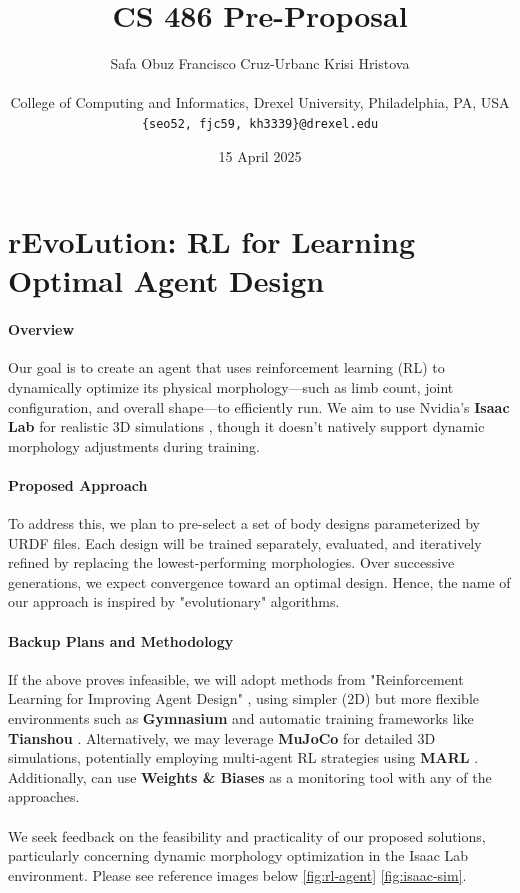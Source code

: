 \documentclass{article}
\title{CS 486 Pre-Proposal}
\author{
Safa Obuz \quad Francisco Cruz-Urbanc \quad Krisi Hristova  \\\\
College of Computing and Informatics, Drexel University, Philadelphia, PA, USA \\
{\tt\small \{seo52, fjc59, kh3339\}@drexel.edu}
}
\date{15 April 2025}
\begin{document}
\maketitle

\section*{\textcolor{lightred}{r}Evo\textcolor{lightred}{L}ution: RL for Learning Optimal Agent Design}

\paragraph{Overview} Our goal is to create an agent that uses reinforcement learning (RL) to dynamically optimize its physical morphology—such as limb count, joint configuration, and overall shape—to efficiently run. We aim to use Nvidia's \textbf{Isaac Lab} for realistic 3D simulations \cite{orbit}, though it doesn't natively support dynamic morphology adjustments during training.
\paragraph{Proposed Approach} To address this, we plan to pre-select a set of body designs parameterized by URDF files. Each design will be trained separately, evaluated, and iteratively refined by replacing the lowest-performing morphologies. Over successive generations, we expect convergence toward an optimal design. Hence, the name of our approach is inspired by "evolutionary" algorithms.
\paragraph{Backup Plans and Methodology} If the above proves infeasible, we will adopt methods from "Reinforcement Learning for Improving Agent Design" \cite{Ha2018designrl}, using simpler (2D) but more flexible environments such as \textbf{Gymnasium} \cite{gymnasium} and automatic training frameworks like \textbf{Tianshou} \cite{tianshou}. Alternatively, we may leverage \textbf{MuJoCo} \cite{mujoco} for detailed 3D simulations, potentially employing multi-agent RL strategies using \textbf{MARL} \cite{marl}. Additionally, can use \textbf{Weights \& Biases} as a monitoring tool with any of the approaches.
\\\\
We seek feedback on the feasibility and practicality of our proposed solutions, particularly concerning dynamic morphology optimization in the Isaac Lab environment. Please see reference images below \ref{fig:rl-agent} \ref{fig:isaac-sim}.
\end{document}
